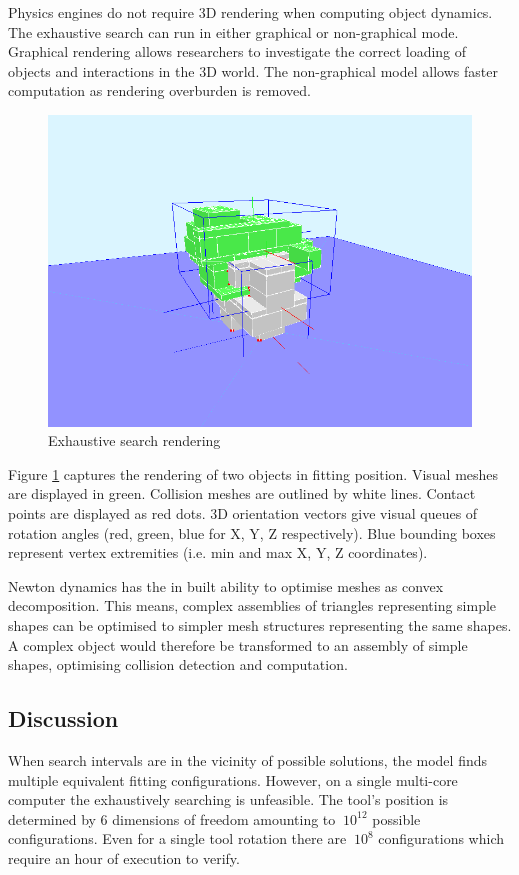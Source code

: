 \documentclass[11]{article}
\begin{document}
Physics engines do not require 3D rendering when computing object dynamics. 
The exhaustive search can run in either graphical or non-graphical mode.
Graphical rendering allows researchers to investigate the correct loading of objects and interactions in the 3D world.
The non-graphical model allows faster computation as rendering overburden is removed. 

\begin{figure}[h]
  \centering
  \includegraphics[width=.7\textwidth]{./figures/newton_simulation.png}
  \caption{Exhaustive search rendering}
  \label{fig:newton_simulation}
\end{figure}      

Figure \ref{fig:newton_simulation} captures the rendering of two objects in fitting position.
Visual meshes are displayed in green.
Collision meshes are outlined by white lines.
Contact points are displayed as red dots.
3D orientation vectors give visual queues of rotation angles (red, green, blue for X, Y, Z respectively).
Blue bounding boxes represent vertex extremities (i.e. min and max X, Y, Z coordinates).
 
Newton dynamics has the in built ability to optimise meshes as convex decomposition.
This means, complex assemblies of triangles representing simple shapes can be optimised to simpler mesh structures representing the same shapes. 
A complex object would therefore be transformed to an assembly of simple shapes, optimising collision detection and computation. 

\subsection{Discussion}
When search intervals are in the vicinity of possible solutions, the model finds multiple equivalent fitting configurations.
However, on a single multi-core computer the exhaustively searching is unfeasible. 
The tool's position is determined by 6 dimensions of freedom amounting to $~10^12$ possible configurations. 
Even for a single tool rotation there are $~10^8$ configurations which require an hour of execution to verify. 
\end{document}
